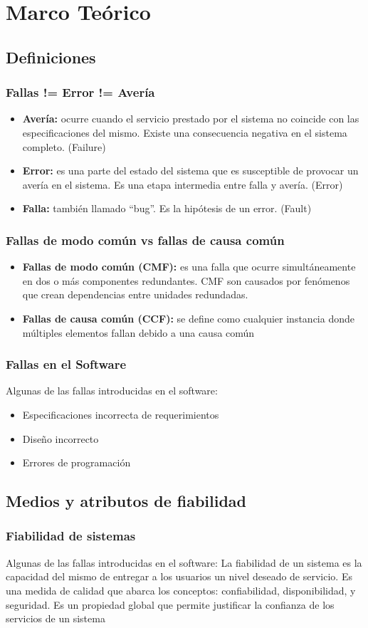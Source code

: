 \section{Marco Teórico}
\subsection{Definiciones}
\begin{frame}
    \frametitle{Fallas != Error != Avería}
    \begin{itemize}
        \item \textbf{Avería:} ocurre cuando el servicio prestado por el sistema no coincide con las especificaciones del mismo.  Existe una consecuencia negativa en el sistema completo. (Failure)
        \item \textbf{Error:} es una parte del estado del sistema que es susceptible de provocar un avería en el sistema. Es una etapa intermedia entre falla y avería. (Error)
        \item \textbf{Falla:} también llamado “bug”. Es la hipótesis de un error. (Fault)
    \end{itemize}
\end{frame}

\begin{frame}
	\frametitle{Fallas de modo común vs fallas de causa común}
	\begin{itemize}
		\item \textbf{Fallas de modo común (CMF):}  es una falla que ocurre simultáneamente en dos o más componentes redundantes. CMF son causados por fenómenos que crean dependencias entre unidades redundadas.
		\item \textbf{Fallas de causa común (CCF):} se define como cualquier instancia donde múltiples elementos fallan debido a una causa común
	\end{itemize}
\end{frame}

\begin{frame}
	\frametitle{Fallas en el Software}
	Algunas de las fallas introducidas en el software:
	\begin{itemize}
		\item Especificaciones incorrecta de requerimientos
		\item Diseño incorrecto
		\item Errores de programación
	\end{itemize}
\end{frame}

\subsection{Medios y atributos de fiabilidad}
\begin{frame}
	\frametitle{Fiabilidad de sistemas}
	Algunas de las fallas introducidas en el software:
	La fiabilidad de un sistema es la capacidad del mismo de entregar a los usuarios un nivel deseado de servicio. 
	\vfill
	Es una medida de calidad que abarca los conceptos: confiabilidad, disponibilidad, y seguridad.
	\vfill
	Es un propiedad global que permite justificar la confianza de los servicios de un sistema 

\end{frame}

